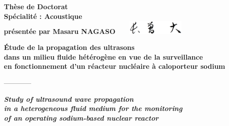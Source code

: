 %
\begin{center}
{
\Large
\bf
Thèse de Doctorat\\
Spécialité :  Acoustique\\
\vspace{0.5cm}
présentée par Masaru NAGASO \ \ \ \includegraphics[height=0.7cm]{images_pdf/Masaru_Nagaso_name_in_Japanese2.pdf}
}\\[1.4cm]

{
\Large
\bf
Étude de la propagation des ultrasons\\
dans un milieu fluide hétérogène en vue de la surveillance\\
en fonctionnement d'un réacteur nucléaire à caloporteur sodium

\vspace{1mm}

 ------------

\vspace{3mm}

\textsl{\textbf{Study of ultrasound wave propagation\\
in a heterogeneous fluid medium for the monitoring\\
\vspace{1.8mm}
of an operating sodium-based nuclear reactor}}
}

\end{center}

\vspace{7mm}

